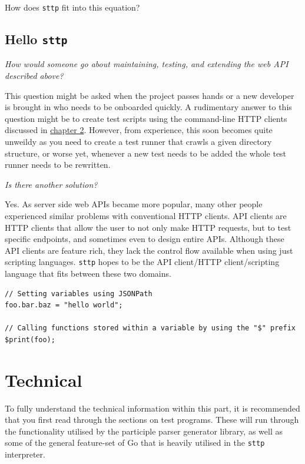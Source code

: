 \documentclass[]{full}
\theoremstyle{definition}
\begin{document}
How does \verb|sttp| fit into this equation?

\cprotect\chapter{Hello \verb|sttp|}

\begin{center}
    \textit{How would someone go about maintaining, testing, and extending the web API described above?}
\end{center}

This question might be asked when the project passes hands or a new developer is brought in who needs to be onboarded quickly. A rudimentary answer to this question might be to create test scripts using the command-line HTTP clients discussed in \hyperref[sec:meet-sttp-http-clients]{chapter 2}. However, from experience, this soon becomes quite unweildy as you need to create a test runner that crawls a given directory structure, or worse yet, whenever a new test needs to be added the whole test runner needs to be rewritten.

\begin{center}
    \textit{Is there another solution?}
\end{center}

Yes. As server side web APIs became more popular, many other people experienced similar problems with conventional HTTP clients. API clients are HTTP clients that allow the user to not only make HTTP requests, but to test specific endpoints, and sometimes even to design entire APIs. Although these API clients are feature rich, they lack the control flow available when using just scripting languages. \verb|sttp| hopes to be the API client/HTTP client/scripting language that fits between these two domains.

\begin{listing}
    \begin{verbatim}
// Setting variables using JSONPath
foo.bar.baz = "hello world";

// Calling functions stored within a variable by using the "$" prefix
$print(foo);
    \end{verbatim}
\end{listing}

\part{Technical}

To fully understand the technical information within this part, it is recommended that you first read through the sections on test programs. These will run through the functionality utilised by the participle parser generator library, as well as some of the general feature-set of Go that is heavily utilised in the \verb|sttp| interpreter.
\end{document}
